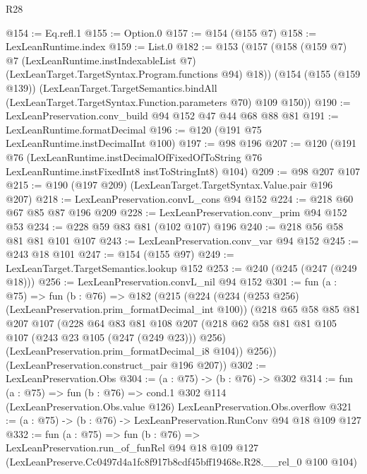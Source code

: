 \begin{lexlean}{R28}
\begin{coremodule}
@154 := Eq.refl.{1}
@155 := Option.{0}
@157 := @154 (@155 @7)
@158 := LexLeanRuntime.index
@159 := List.{0}
@182 := @153
    (@157
      (@158
        (@159 @7)
        @7
        (LexLeanRuntime.instIndexableList @7)
        (LexLeanTarget.TargetSyntax.Program.functions @94)
        @18))
    (@154
      (@155 (@159 @139))
      (LexLeanTarget.TargetSemantics.bindAll
        (LexLeanTarget.TargetSyntax.Function.parameters @70)
        @109
        @150))
@190 := LexLeanPreservation.conv_build @94 @152 @47 @44 @68 @88 @81
@191 := LexLeanRuntime.formatDecimal
@196 := @120 (@191 @75 LexLeanRuntime.instDecimalInt @100)
@197 := @98 @196
@207 := @120
    (@191
      @76
      (LexLeanRuntime.instDecimalOfFixedOfToString
        @76
        LexLeanRuntime.instFixedInt8
        instToStringInt8)
      @104)
@209 := @98 @207 @107
@215 := @190 (@197 @209) (LexLeanTarget.TargetSyntax.Value.pair @196 @207)
@218 := LexLeanPreservation.convL_cons @94 @152
@224 := @218 @60 @67 @85 @87 @196 @209
@228 := LexLeanPreservation.conv_prim @94 @152 @53
@234 := @228 @59 @83 @81 (@102 @107) @196
@240 := @218 @56 @58 @81 @81 @101 @107
@243 := LexLeanPreservation.conv_var @94 @152
@245 := @243 @18 @101
@247 := @154 (@155 @97)
@249 := LexLeanTarget.TargetSemantics.lookup @152
@253 := @240 (@245 (@247 (@249 @18)))
@256 := LexLeanPreservation.convL_nil @94 @152
@301 := fun (a : @75) =>
  fun (b : @76) =>
  @182
    (@215
      (@224
        (@234 (@253 @256) (LexLeanPreservation.prim_formatDecimal_int @100))
        (@218
          @65
          @58
          @85
          @81
          @207
          @107
          (@228
            @64
            @83
            @81
            @108
            @207
            (@218 @62 @58 @81 @81 @105 @107 (@243 @23 @105 (@247 (@249 @23))) @256)
            (LexLeanPreservation.prim_formatDecimal_i8 @104))
          @256))
      (LexLeanPreservation.construct_pair @196 @207))
@302 := LexLeanPreservation.Obs
@304 := (a : @75) -> (b : @76) -> @302
@314 := fun (a : @75) =>
  fun (b : @76) =>
  cond.{1} @302 @114 (LexLeanPreservation.Obs.value @126) LexLeanPreservation.Obs.overflow
@321 := (a : @75) -> (b : @76) -> LexLeanPreservation.RunConv @94 @18 @109 @127
@332 := fun (a : @75) =>
  fun (b : @76) =>
  LexLeanPreservation.run_of_funRel
    @94
    @18
    @109
    @127
    (LexLeanPreserve.Cc0497d4a1fc8f917b8cdf45bff19468e.R28.__rel_0 @100 @104)
\end{coremodule}
\end{lexlean}
